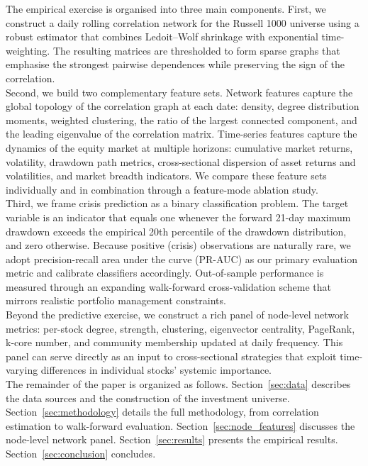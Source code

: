 \documentclass{article}
\begin{document}
The empirical exercise is organised into three main components. First, we construct a daily rolling correlation network for the Russell 1000 universe using a robust estimator that combines Ledoit--Wolf shrinkage with exponential time-weighting. The resulting matrices are thresholded to form sparse graphs that emphasise the strongest pairwise dependences while preserving the sign of the correlation.\\

Second, we build two complementary feature sets. Network features capture the global topology of the correlation graph at each date: density, degree distribution moments, weighted clustering, the ratio of the largest connected component, and the leading eigenvalue of the correlation matrix. Time-series features capture the dynamics of the equity market at multiple horizons: cumulative market returns, volatility, drawdown path metrics, cross-sectional dispersion of asset returns and volatilities, and market breadth indicators. We compare these feature sets individually and in combination through a feature-mode ablation study.\\

Third, we frame crisis prediction as a binary classification problem. The target variable is an indicator that equals one whenever the forward 21-day maximum drawdown exceeds the empirical 20th percentile of the drawdown distribution, and zero otherwise. Because positive (crisis) observations are naturally rare, we adopt precision-recall area under the curve (PR-AUC) as our primary evaluation metric and calibrate classifiers accordingly. Out-of-sample performance is measured through an expanding walk-forward cross-validation scheme that mirrors realistic portfolio management constraints.\\

Beyond the predictive exercise, we construct a rich panel of node-level network metrics: per-stock degree, strength, clustering, eigenvector centrality, PageRank, k-core number, and community membership updated at daily frequency. This panel can serve directly as an input to cross-sectional strategies that exploit time-varying differences in individual stocks' systemic importance.\\

The remainder of the paper is organized as follows. Section~\ref{sec:data} describes the data sources and the construction of the investment universe. Section~\ref{sec:methodology} details the full methodology, from correlation estimation to walk-forward evaluation. Section~\ref{sec:node_features} discusses the node-level network panel. Section~\ref{sec:results} presents the empirical results. Section~\ref{sec:conclusion} concludes.
\end{document}
